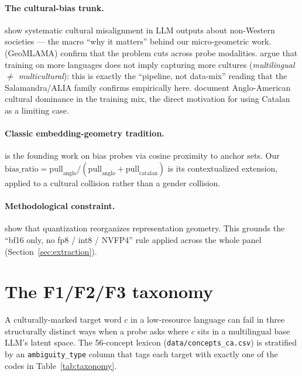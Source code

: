 \documentclass[10pt,twocolumn,a4paper]{article}
\newcommand{\code}[1]{\texttt{\small #1}}
\begin{document}
\paragraph{The cultural-bias trunk.}
\citet{tao2024} show systematic cultural misalignment in LLM outputs about
non-Western societies --- the macro ``why it matters'' behind our
micro-geometric work. \citet{li2023} (GeoMLAMA) confirm that the problem cuts
across probe modalities. \citet{rystrom2025} argue that training on more
languages does not imply capturing more cultures (\emph{multilingual $\neq$
multicultural}): this is exactly the ``pipeline, not data-mix'' reading that
the Salamandra/ALIA family confirms empirically here. \citet{wang2023}
document Anglo-American cultural dominance in the training mix, the direct
motivation for using Catalan as a limiting case.

\paragraph{Classic embedding-geometry tradition.}
\citet{bolukbasi2016} is the founding work on bias probes via cosine
proximity to anchor sets. Our
$\text{bias\_ratio} = \text{pull}_{\text{anglo}}/(\text{pull}_{\text{anglo}}
+ \text{pull}_{\text{catalan}})$ is its contextualized extension, applied to a
cultural collision rather than a gender collision.

\paragraph{Methodological constraint.}
\citet{dettmers2022} show that quantization reorganizes representation
geometry. This grounds the ``bf16 only, no fp8 / int8 / NVFP4'' rule applied
across the whole panel (Section~\ref{sec:extraction}).

\section{The F1/F2/F3 taxonomy}\label{sec:taxonomy}

A culturally-marked target word $c$ in a low-resource language can fail in
three structurally distinct ways when a probe asks where $c$ sits in a
multilingual base LLM's latent space. The 56-concept lexicon
(\code{data/concepts\_ca.csv}) is stratified by an \code{ambiguity\_type}
column that tags each target with exactly one of the codes in
Table~\ref{tab:taxonomy}.
\end{document}
